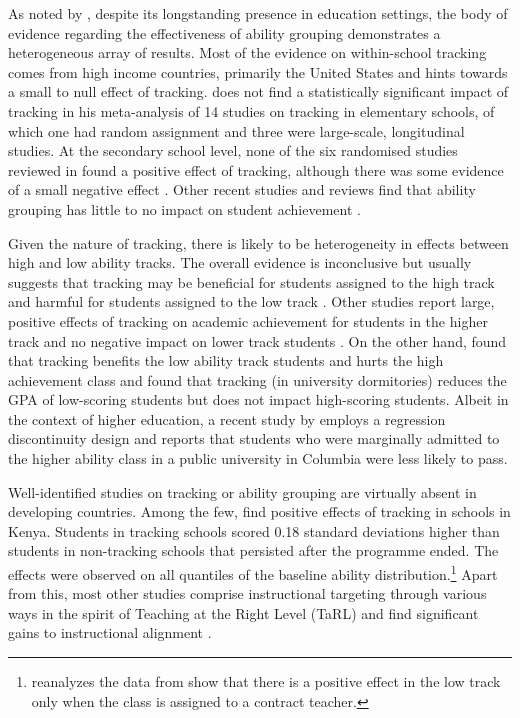 \documentclass[12pt]{article}
\begin{document}
As noted by \cite{betts:2011}, despite its longstanding presence in education settings, the body of evidence regarding the effectiveness of ability grouping demonstrates a heterogeneous array of results. Most of the evidence on within-school tracking comes from high income countries, primarily the United States and hints towards a small to null effect of tracking. \cite{slavin:1987} does not find a statistically significant impact of tracking in his meta-analysis of 14 studies on tracking in elementary schools, of which one had random assignment and three were large-scale, longitudinal studies. At the secondary school level, none of the six randomised studies reviewed in \cite{slavin1990achievement} found a positive effect of tracking, although there was some evidence of a small negative effect \citep{hanushek2006does}. Other recent studies and reviews find that ability grouping has little to no impact on student achievement \citep{kulik1987effects, terrin2022effect}.

Given the nature of tracking, there is likely to be heterogeneity in effects between high and low ability tracks. The overall evidence is inconclusive but usually suggests that tracking may be beneficial for students assigned to the high track and harmful for students assigned to the low track \citep{fu2018ability, lavrijsen2015new, burke2013classroom, hoxby2005taking}. Other studies report large, positive effects of tracking on academic achievement for students in the higher track and no negative impact on lower track students \citep{card2016can, vardardottir2013peer, antonovics/black/cullen/meiselman:2022}. On the other hand, \cite{antecol2016peer} found that tracking benefits the low ability track students and hurts the high achievement class and \cite{garlick} found that tracking (in university dormitories) reduces the GPA of low-scoring students but does not impact high-scoring students. Albeit in the context of higher education, a recent study by \cite{de2022college} employs a regression discontinuity design and reports that students who were marginally admitted to the higher ability class in a public university in Columbia were less likely to pass. 

Well-identified studies on tracking or ability grouping are virtually absent in developing countries.  Among the few, \cite{duflodupaskremer} find positive effects of tracking in schools in Kenya. Students in tracking schools scored 0.18 standard deviations higher than students in non-tracking schools that persisted after the programme ended. The effects were observed on all quantiles of the baseline ability distribution.\footnote{\cite{cummins2017heterogeneous} reanalyzes the data from  \cite{duflodupaskremer} show that there is a positive effect in the low track only when the class is assigned to a contract teacher.} Apart from this, most other studies comprise instructional targeting through various ways in the spirit of Teaching at the Right Level (TaRL) and find significant gains to instructional alignment \citep{banerjee2017proof, duflo2020experimental}. 
\end{document}
